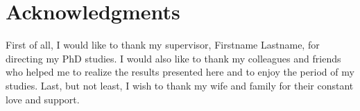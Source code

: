 \chapter*{Acknowledgments}
\markboth{}{}

First of all, I would like to thank my supervisor, Firstname Lastname, for directing my PhD studies. I would also like to thank my colleagues and friends who helped me to realize the results presented here and to enjoy the period of my studies. 
Last, but not least, I wish to thank my wife and family for their constant love and support. 